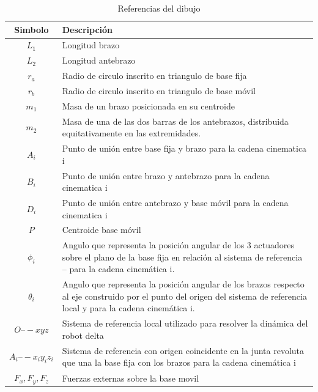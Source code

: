            \begin{table}[h]
            \centering
            \renewcommand{\arraystretch}{1.5}
                \begin{tabular}{c m{11cm}}
            \hline
                \textbf{Simbolo}& \textbf{Descripción} \\ 
            \hline             \hline
             $L_{1}$ &  Longitud brazo\\
            \hline
             $L_{2}$ & Longitud antebrazo \\
            \hline
            $ r_{a}$ &  Radio de circulo inscrito en triangulo de base fija\\
            \hline
             $r_{b}$ & Radio de circulo inscrito en triangulo de base móvil \\
            \hline
            $m_{1}$ & Masa de un brazo posicionada en su centroide \\
            \hline
             $m_{2}$ & Masa de una de las dos barras de los antebrazos, distribuida equitativamente en las extremidades. \\
            \hline
             $A_{i}$ & Punto de unión entre base fija y brazo para la cadena cinematica i \\
            \hline
             $B_{i}$ & Punto de unión entre brazo y antebrazo para la cadena cinematica i \\
            \hline
             $D_{i}$ & Punto de unión entre antebrazo y base móvil para la cadena cinematica i \\
            \hline
             $P$ & Centroide base móvil\\
            \hline
             $\phi _{i}$ & Angulo que representa la posición angular de los 3 actuadores sobre el plano de la base fija en relación al sistema de referencia  –  para la cadena cinemática i. \\
            \hline
             $\theta _{i}$ & Angulo que representa la posición angular de los brazos respecto al eje construido por el punto del origen del sistema de referencia local  y  para la cadena cinemática i.\\
            \hline
             $O –- xyz$ & Sistema de referencia local utilizado para resolver la dinámica del robot delta \\
            \hline
            $A_{i} –- x_{i}y_{i}z_{i}$ & Sistema de referencia con origen coincidente en la junta revoluta que una la base fija con los brazos para la cadena cinemática i \\
            \hline
             $F_{x},F_{y},F_{z}$ & Fuerzas externas sobre la base movil\\
            \hline
            \end{tabular}
           \caption{Referencias del dibujo}
           \label{tab:cap4_tabla_dina_ma_2}
        \end{table}
   

